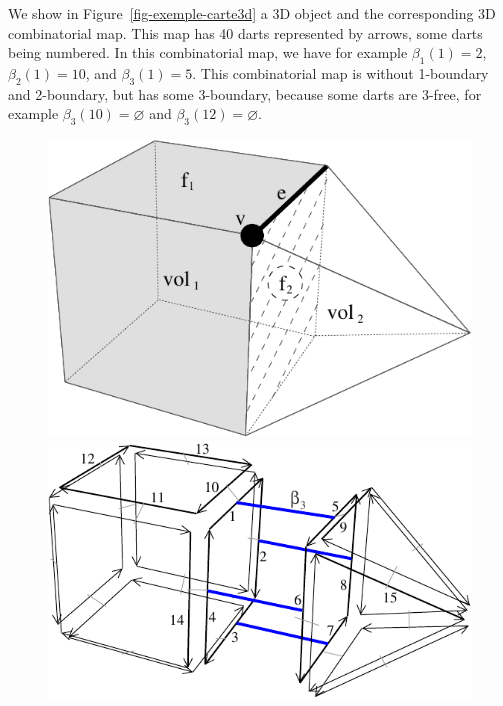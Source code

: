 We show in Figure~\ref{fig-exemple-carte3d} a 3D object and the
corresponding 3D combinatorial map.  This map has 40 darts represented
by arrows, some darts being numbered. In this combinatorial map, we
have for example $\beta_1(1)=2$, $\beta_2(1)=10$, and
$\beta_3(1)=5$. This combinatorial map is without 1-boundary and
2-boundary, but has some 3-boundary, because some darts are $3$-free,
for example $\beta_3(10)=\varnothing$ and $\beta_3(12)=\varnothing$.
%
\def\LargFig{.4\textwidth}
\begin{figure}
  \begin{ccTexOnly}
    \begin{center}
      \includegraphics[width=\LargFig]{Combinatorial_map/fig/pdf/object3d}\qquad
      \includegraphics[width=\LargFig]{Combinatorial_map/fig/pdf/exemple-carte2-3d}
    \end{center}
  \end{ccTexOnly}
  \begin{ccHtmlOnly}

\end{ccHtmlOnly}
\end{figure}
